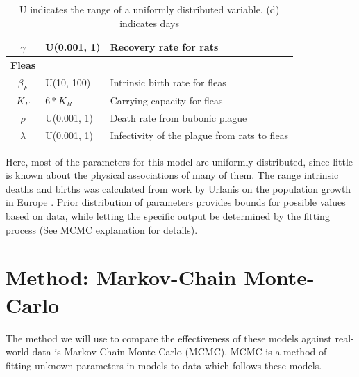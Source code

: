 \documentclass [letterpaper, 12pt] {article}
\begin{document}
\begin{table}[H]
{\begin{tabular}{|c|l|l|}
			$\gamma$                                 & U(0.001, 1)                         & Recovery rate for rats                       \\ \hline
			\multicolumn{1}{|l|}{\textbf{Fleas}}     &                                     &                                              \\
			$\beta_F$                                & U(10, 100)                          & Intrinsic birth rate for fleas               \\
			$K_F$                                    & $6 * K_R$                           & Carrying capacity for fleas                  \\
			$\rho$                                   & U(0.001, 1)                         & Death rate from bubonic plague               \\
			$\lambda$                                & U(0.001, 1)                         & Infectivity of the plague from rats to fleas \\ \hline
		\end{tabular}%
	}
	\caption{U indicates the range of a uniformly distributed variable. (d) indicates days}
\end{table}

Here, most of the parameters for this model are uniformly distributed, since little is known about the physical associations of many of them. The range intrinsic deaths and births was calculated from work by Urlanis on the population growth in Europe \cite{Urlanis}. Prior distribution of parameters provides bounds for possible values based on data, while letting the specific output be determined by the fitting process (See MCMC explanation for details).



\pagebreak

\section{Method: Markov-Chain Monte-Carlo}

The method we will use to compare the effectiveness of these models against real-world data is Markov-Chain Monte-Carlo (MCMC). MCMC is a method of fitting unknown parameters in models to data which follows these models.
\end{document}
